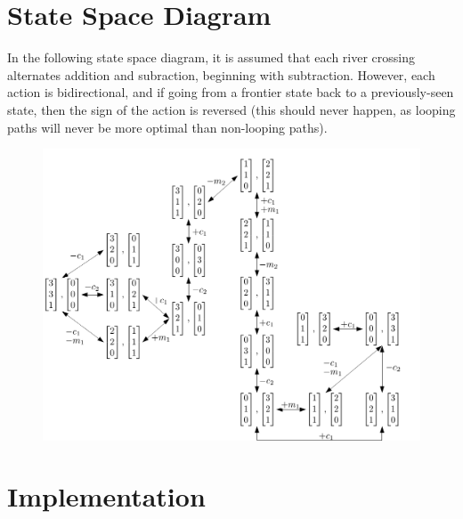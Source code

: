 \documentclass[11pt]{article}
\begin{document}
\section{State Space Diagram}
In the following state space diagram, it is assumed that each river crossing alternates addition and subraction, beginning with subtraction. However, each action is bidirectional, and if going from a frontier state back to a previously-seen state, then the sign of the action is reversed (this should never happen, as looping paths will never be more optimal than non-looping paths).
\begin{figure}[H] 
  \includegraphics[scale=0.5]{State-Space-Matrices.png}
\end{figure}

\section{Implementation}
\end{document}
